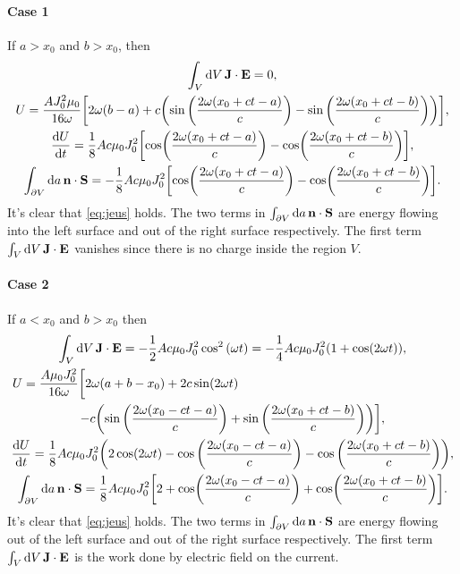 \documentclass{article}
\begin{document}
\paragraph*{Case 1}
If $a>x_0$ and $b>x_0$, then
\begin{gather*}
    \int_V \dd{V} \vb{J}\cdot \vb{E} = 0, \\
    U = \frac{A J_0^2\mu_0}{16\omega}\qty[2\omega(b-a) + c\qty(\sin\qty(\frac{2\omega(x_0+ct-a)}{c}) - \sin\qty(\frac{2\omega(x_0+ct-b)}{c}))], \\
    \dv{U}{t} = \frac{1}{8} A c \mu_0 J_0^2 \qty[\cos(\frac{2\omega(x_0+ct-a)}{c}) - \cos(\frac{2\omega(x_0+ct-b)}{c})], \\
    \int_{\partial V} \dd{a} \vb{n}\cdot\vb{S} = -\frac{1}{8} A c \mu_0 J_0^2 \qty[\cos(\frac{2\omega(x_0+ct-a)}{c}) - \cos(\frac{2\omega(x_0+ct-b)}{c})].
\end{gather*}
It's clear that \cref{eq:jeus} holds.
The two terms in $\int_{\partial V} \dd{a} \vb{n}\cdot\vb{S}$ are energy flowing into the left surface and out of the right surface respectively.
The first term $\int_V \dd{V} \vb{J}\cdot \vb{E}$ vanishes since there is no charge inside the region $V$.
\paragraph*{Case 2} If $a<x_0$ and $b>x_0$ then
\begin{gather*}
    \int_V \dd{V} \vb{J}\cdot \vb{E} = -\frac{1}{2} A c \mu_0 J_0^2 \cos^2 \qty(\omega t) = -\frac{1}{4} A c \mu_0 J_0^2 (1+\cos(2\omega t)),\\
    U = \frac{A \mu_0 J_0^2}{16\omega}\bigg[2\omega(a+b-x_0) + 2c\sin(2\omega t) \hspace{6cm} \\ - c\qty(\sin\qty(\frac{2\omega(x_0-ct-a)}{c}) + \sin\qty(\frac{2\omega(x_0+ct-b)}{c}))
    \bigg], \\
    \dv{U}{t} = \frac{1}{8} A c\mu_0 J_0^2\qty(2\cos(2\omega t) - \cos\qty(\frac{2\omega(x_0-ct-a)}{c}) - \cos\qty(\frac{2\omega(x_0+ct-b)}{c})), \\
    \int_{\partial V} \dd{a} \vb{n}\cdot\vb{S} = \frac{1}{8} A c \mu_0 J_0^2 \qty[2+\cos(\frac{2\omega(x_0-ct-a)}{c}) + \cos(\frac{2\omega(x_0+ct-b)}{c})].
\end{gather*}
It's clear that \cref{eq:jeus} holds.
The two terms in $\int_{\partial V} \dd{a} \vb{n}\cdot\vb{S}$ are energy flowing out of the left surface and out of the right surface respectively.
The first term $\int_V \dd{V} \vb{J}\cdot \vb{E}$ is the work done by electric field on the current.
\end{document}
